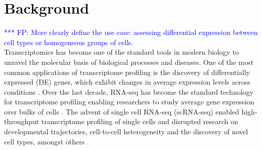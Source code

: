 \documentclass{bmcart}
\newcommand{\fanny}[1]{\textcolor{blue}{*** FP: #1}}
\begin{document}
\begin{frontmatter}
\begin{fmbox}
\begin{abstractbox}
\begin{keyword}
\end{keyword}


\end{abstractbox}
%
\end{fmbox}%

\end{frontmatter}





\section*{Background}

\fanny{More clearly define the use case: assessing differential expression between cell types or homogeneous groups of cells.}\\
Transcriptomics has become one of the standard tools in modern biology to unravel the molecular basis of biological processes and diseases. One of the most common applications of transcriptome profiling is the discovery of differentially expressed (DE) genes, which exhibit changes in average expression levels across conditions \cite{Love2014, Robinson2010a, Law2014}. Over the last decade, RNA-seq has become the standard technology for transcriptome profiling enabling researchers to study average gene expression over bulks of cells \cite{Wang2009, Goodwin2016}.  The advent of single cell RNA-seq (scRNA-seq) enabled high-throughput transcriptome profiling of single cells and disrupted research on developmental trajectories, cell-to-cell heterogeneity and the discovery of novel cell types, amongst others \cite{Lonnberg2017, Buettner2015, Patel2014, Kolodziejczyk2015, Li2017, Usoskin2014}.
 
\end{document}
